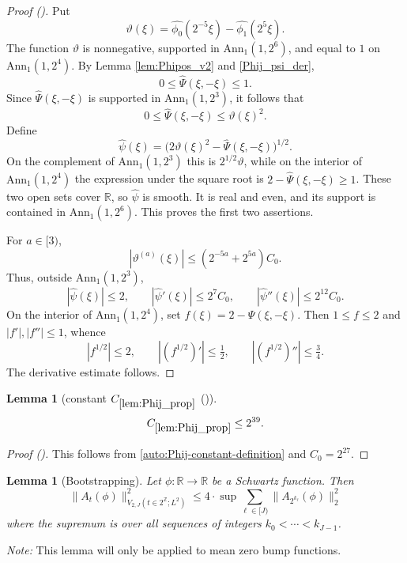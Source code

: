 \documentclass[12pt,reqno]{amsart}
\newcommand{\auto}{{({\tiny\faCar})}}
\theoremstyle{plain}
\newtheorem{lemma}[theorem]{Lemma}
\numberwithin{equation}{section}
\theoremstyle{remark}
\newcommand{\using}[1]{}
\newcommand{\Z}{{\mathbb Z}}
\newcommand{\R}{{\mathbb R}}
\begin{document}
\begin{proof}[Proof \auto]
Put
\[
\vartheta(\xi)=\widehat{\phi_0}(2^{-5}\xi)-\widehat{\phi_1}(2^5\xi).
\]
The function $\vartheta$ is nonnegative, supported in $\mathrm{Ann}_1(1,2^6)$, and equal to $1$ on $\mathrm{Ann}_1(1,2^4)$. By Lemma \ref{lem:Phipos_v2} and \eqref{Phij_psi_der},
\[
0\le\widehat\Psi(\xi,-\xi)\le1.
\]
Since $\widehat\Psi(\xi,-\xi)$ is supported in $\mathrm{Ann}_1(1,2^3)$, it follows that
\begin{equation}\label{eqn:lemPhij_proppf}
0\le\widehat\Psi(\xi,-\xi)\le\vartheta(\xi)^2.
\end{equation}
Define
\begin{equation}\label{def_sqrtpsi}
\widehat\psi(\xi)=\bigl(2\vartheta(\xi)^2-\widehat\Psi(\xi,-\xi)\bigr)^{1/2}.
\end{equation}
On the complement of $\mathrm{Ann}_1(1,2^3)$ this is $2^{1/2}\vartheta$, while on the interior of $\mathrm{Ann}_1(1,2^4)$ the expression under the square root is $2-\widehat\Psi(\xi,-\xi)\ge1$. These two open sets cover $\R$, so $\widehat\psi$ is smooth. It is real and even, and its support is contained in $\mathrm{Ann}_1(1,2^6)$. This proves the first two assertions.

For $a\in[3)$,
\[
|\vartheta^{(a)}(\xi)|
\le (2^{-5a}+2^{5a})C_0.
\]
Thus, outside $\mathrm{Ann}_1(1,2^3)$,
\[
|\widehat\psi(\xi)|\le2,
\qquad
|\widehat\psi'(\xi)|\le2^7C_0,
\qquad
|\widehat\psi''(\xi)|\le2^{12}C_0.
\]
On the interior of $\mathrm{Ann}_1(1,2^4)$, set $f(\xi)=2-\widehat\Psi(\xi,-\xi)$. Then $1\le f\le2$ and $|f'|,|f''|\le1$, whence
\[
|f^{1/2}|\le2,
\qquad
|(f^{1/2})'|\le\tfrac12,
\qquad
|(f^{1/2})''|\le\tfrac34.
\]
The derivative estimate follows.
\end{proof}

\begin{lemma}[constant $C_{\ref{lem:Phij_prop}}$ \auto]\label{constant Phij proposition}\using{lem:Phij_prop}
\begin{equation}\label{constant Phij proposition bound}
C_{\ref{lem:Phij_prop}}\le2^{39}.
\end{equation}
\end{lemma}
\begin{proof}[Proof \auto]
This follows from \eqref{auto:Phij-constant-definition} and $C_0=2^{27}$.
\end{proof}


\begin{lemma}[Bootstrapping]
\label{lem:bootstrap}
Let $\phi:\R\to \R$ be a Schwartz function.
Then
    \begin{equation}\label{auto:dyadic-variation-bootstrap}\|A_{t}(\phi)\|^2_{V_{2,J}(t\in 2^{\Z}; L^2)} \le  4 \cdot \sup \sum_{\ell\in [J)} \|A_{2^{k_{\ell}}}(\phi)\|^2_2     \end{equation}
    where the supremum is over all sequences of integers $k_0<\cdots <k_{J-1}$.
\end{lemma}
{\em Note:} This lemma will only be applied to mean zero bump functions.
\end{document}

